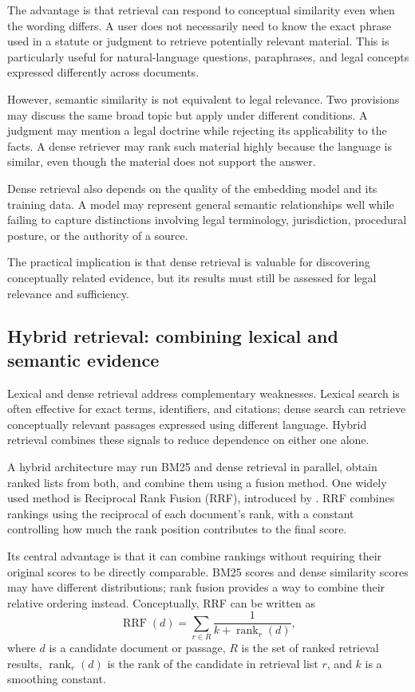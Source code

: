 The advantage is that retrieval can respond to conceptual similarity even when the wording differs. A
user does not necessarily need to know the exact phrase used in a statute or judgment to retrieve
potentially relevant material. This is particularly useful for natural-language questions, paraphrases,
and legal concepts expressed differently across documents.

However, semantic similarity is not equivalent to legal relevance. Two provisions may discuss the same
broad topic but apply under different conditions. A judgment may mention a legal doctrine while
rejecting its applicability to the facts. A dense retriever may rank such material highly because the
language is similar, even though the material does not support the answer.

Dense retrieval also depends on the quality of the embedding model and its training data. A model may
represent general semantic relationships well while failing to capture distinctions involving legal
terminology, jurisdiction, procedural posture, or the authority of a source.

The practical implication is that dense retrieval is valuable for discovering conceptually related
evidence, but its results must still be assessed for legal relevance and sufficiency.

\subsection{Hybrid retrieval: combining lexical and semantic evidence}

Lexical and dense retrieval address complementary weaknesses. Lexical search is often effective for
exact terms, identifiers, and citations; dense search can retrieve conceptually relevant passages
expressed using different language. Hybrid retrieval combines these signals to reduce dependence on
either one alone.

A hybrid architecture may run BM25 and dense retrieval in parallel, obtain ranked lists from both, and
combine them using a fusion method. One widely used method is Reciprocal Rank Fusion (RRF), introduced
by \citet{cormack2009}. RRF combines rankings using the reciprocal of each document's rank, with a
constant controlling how much the rank position contributes to the final score.

Its central advantage is that it can combine rankings without requiring their original scores to be
directly comparable. BM25 scores and dense similarity scores may have different distributions; rank
fusion provides a way to combine their relative ordering instead. Conceptually, RRF can be written as
\begin{equation}
\operatorname{RRF}(d)=\sum_{r \in R}\frac{1}{k+\operatorname{rank}_{r}(d)},
\end{equation}
where $d$ is a candidate document or passage, $R$ is the set of ranked retrieval results,
$\operatorname{rank}_{r}(d)$ is the rank of the candidate in retrieval list $r$, and $k$ is a
smoothing constant.

